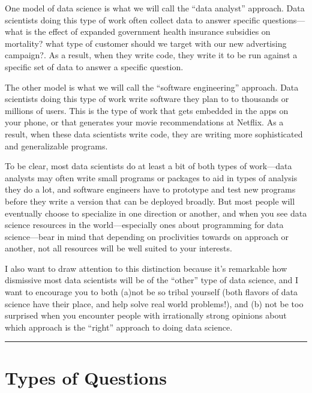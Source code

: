 \documentclass[letterpaper,10pt,english]{jupyterBook}
\begin{document}
\sphinxAtStartPar
One model of data science is what we will call the “data analyst” approach. Data scientists doing this type of work often collect data to answer specific questions—what is the effect of expanded government health insurance subsidies on mortality? what type of customer should we target with our new advertising campaign?. As a result, when they write code, they write it to be run against a specific set of data to answer a specific question.

\sphinxAtStartPar
The other model is what we will call the “software engineering” approach. Data scientists doing this type of work write software they plan to  to thousands or millions of users. This is the type of work that gets embedded in the apps on your phone, or that generates your movie recommendations at Netflix. As a result, when these data scientists write code, they are writing more sophisticated and generalizable programs.

\sphinxAtStartPar
To be clear, most data scientists do at least a bit of both types of work—data analysts may often write small programs or packages to aid in types of analysis they do a lot, and software engineers have to prototype and test new programs before they write a version that can be deployed broadly. But most people will eventually choose to specialize in one direction or another, and when you see data science resources in the world—especially ones about programming for data science—bear in mind that depending on  proclivities towards on approach or another, not all resources will be well suited to your interests.

\sphinxAtStartPar
I also want to draw attention to this distinction because it’s remarkable how dismissive most data scientists will be of the “other” type of data science, and I want to encourage you to both (a)not be so tribal yourself (both flavors of data science have their place, and help solve real world problems!), and (b) not be too surprised when you encounter people with irrationally strong opinions about which approach is the “right” approach to doing data science.


\bigskip\hrule\bigskip


\sphinxstepscope


\part{Types of Questions}

\sphinxstepscope
\end{document}

